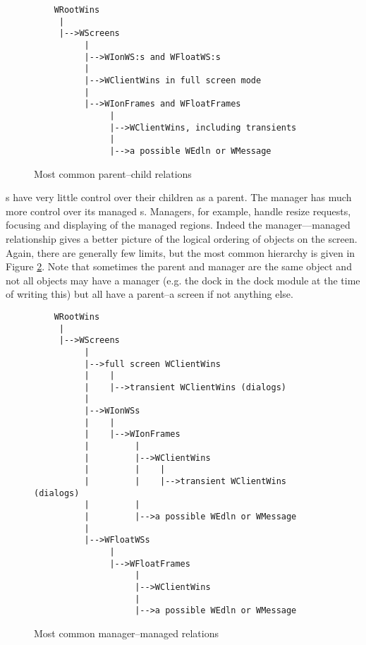 \begin{figure}
\begin{htmlonly}
\docode %
\end{htmlonly}
\begin{verbatim}
    WRootWins
     |
     |-->WScreens
          |
          |-->WIonWS:s and WFloatWS:s
          |
          |-->WClientWins in full screen mode
          |
          |-->WIonFrames and WFloatFrames
               |
               |-->WClientWins, including transients
               |
               |-->a possible WEdln or WMessage
\end{verbatim}
\caption{Most common parent--child relations}
\label{fig:parentship}
\end{figure}

s have very little control over their children as a parent.
The manager  has much more control over its
managed s. Managers, for example, handle resize requests,
focusing and displaying of the managed regions. Indeed the manager---managed
relationship gives a better picture of the logical ordering of objects on
the screen. Again, there are generally few limits, but the most common
hierarchy is given in Figure \ref{fig:managership}. Note that sometimes
the parent and manager are the same object and not all objects may have
a manager (e.g. the dock in the dock module at the time of writing this)
but all have a parent--a screen if not anything else.

\begin{figure}
\begin{htmlonly}
\docode %
\end{htmlonly}
\begin{verbatim}
    WRootWins
     |
     |-->WScreens
          |
          |-->full screen WClientWins
          |    |
          |    |-->transient WClientWins (dialogs)
          |
          |-->WIonWSs
          |    |
          |    |-->WIonFrames
          |         |
          |         |-->WClientWins
          |         |    |
          |         |    |-->transient WClientWins (dialogs)
          |         |
          |         |-->a possible WEdln or WMessage
          |
          |-->WFloatWSs
               |
               |-->WFloatFrames
                    |
                    |-->WClientWins
                    |
                    |-->a possible WEdln or WMessage
\end{verbatim}
\caption{Most common manager--managed relations}
\label{fig:managership}
\end{figure}

